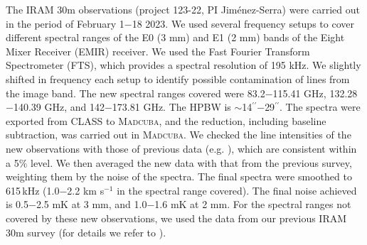 \documentclass[twocolumn]{aastex63}
\begin{document}
The IRAM 30m observations (project 123-22, PI Jim\'enez-Serra) were carried out in the period of February 1$-$18 2023. We used several frequency setups to cover different spectral ranges of the E0 (3 mm) and E1 (2 mm) bands of the Eight Mixer Receiver (EMIR) receiver. We used the Fast Fourier Transform Spectrometer (FTS), which provides a spectral resolution of 195 kHz. We slightly shifted in frequency each setup to identify possible contamination of lines from the image band. 
%
The new spectral ranges covered were 83.2$-$115.41 GHz, 132.28$-$140.39 GHz, and 142$-$173.81 GHz. The HPBW is $\sim$14$^{\prime\prime}$$-$29$^{\prime\prime}$. The spectra were exported from CLASS to \textsc{Madcuba}, and the reduction, including baseline subtraction, was carried out in \textsc{Madcuba}. We checked the line intensities of the new observations with those of previous data (e.g. \citealt{rodriguez-almeida2021a,rivilla2021a}), which are consistent within a 5$\%$ level. We then averaged the new data with that from the previous survey, weighting them by the noise of the spectra. 
The final spectra were smoothed to 615\,kHz (1.0$-$2.2 km s$^{-1}$ in the spectral range covered).
The final noise achieved is 0.5$-$2.5 mK at 3 mm, and 1.0$-$1.6 mK at 2 mm. For the spectral ranges not covered by these new observations, we used the data from our previous IRAM 30m survey (for details we refer to \citealt{rodriguez-almeida2021a,rivilla2022b,rivilla2022c}).
\end{document}

